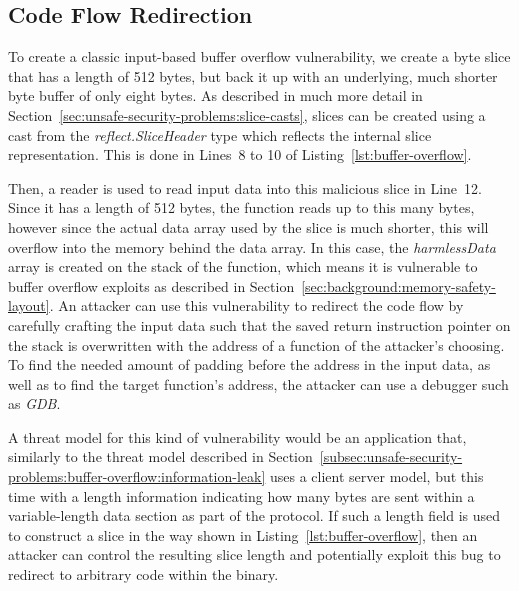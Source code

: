
\subsection{Code Flow Redirection}\label{subsec:unsafe-security-problems:buffer-overflow:code-flow-redirection}

To create a classic input-based buffer overflow vulnerability, we create a byte slice that has a length of 512 bytes,
but back it up with an underlying, much shorter byte buffer of only eight bytes.
As described in much more detail in Section~\ref{sec:unsafe-security-problems:slice-casts}, slices can be created using
a cast from the \textit{reflect.SliceHeader} type which reflects the internal slice representation.
This is done in Lines~8 to 10 of Listing~\ref{lst:buffer-overflow}.



Then, a reader is used to read input data into this malicious slice in Line~12.
Since it has a length of 512 bytes, the function reads up to this many bytes, however since the actual data array used
by the slice is much shorter, this will overflow into the memory behind the data array.
In this case, the \textit{harmlessData} array is created on the stack of the function, which means it is vulnerable to
buffer overflow exploits as described in Section~\ref{sec:background:memory-safety-layout}.
An attacker can use this vulnerability to redirect the code flow by carefully crafting the input data such that the
saved return instruction pointer on the stack is overwritten with the address of a function of the attacker's choosing.
To find the needed amount of padding before the address in the input data, as well as to find the target function's
address, the attacker can use a debugger such as \textit{GDB}.

A threat model for this kind of vulnerability would be an application that, similarly to the threat model described in
Section~\ref{subsec:unsafe-security-problems:buffer-overflow:information-leak} uses a client server model, but this time
with a length information indicating how many bytes are sent within a variable-length data section as part of the
protocol.
If such a length field is used to construct a slice in the way shown in Listing~\ref{lst:buffer-overflow}, then an
attacker can control the resulting slice length and potentially exploit this bug to redirect to arbitrary code within
the binary.


